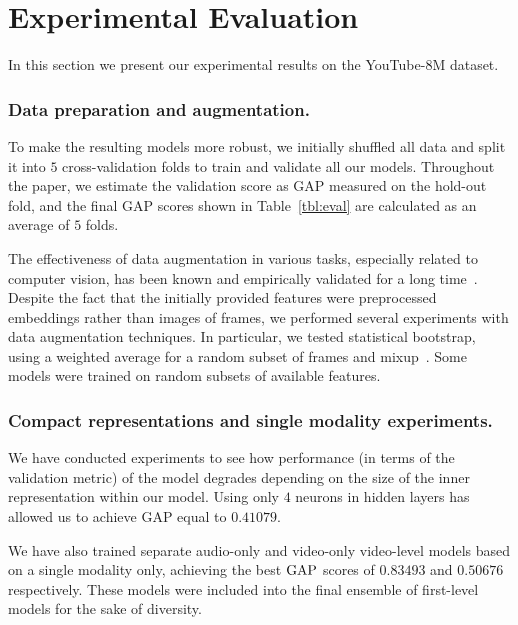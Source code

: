 \documentclass[runningheads]{llncs}
\begin{document}
\section{Experimental Evaluation}\label{sec:eval}

In this section we present our experimental results on the YouTube-8M dataset.

\subsubsection*{Data preparation and augmentation.}
To make the resulting models more robust, we initially shuffled all data and split it into $5$ cross-validation folds to train and validate all our models. Throughout the paper, we estimate the validation score as GAP measured on the hold-out fold, and the final GAP scores shown in Table~\ref{tbl:eval} are calculated as an average of $5$ folds.

The effectiveness of data augmentation in various tasks, especially related to computer vision, has been known and empirically validated for a long time~\cite{DBLP:journals/corr/abs-1003-0358,DBLP:journals/corr/abs-1712-04621,DBLP:journals/corr/abs-1708-06020}. Despite the fact that the initially provided features were preprocessed embeddings rather than images of frames, we performed several experiments with data augmentation techniques. In particular, we tested statistical bootstrap, using a weighted average for a random subset of frames and mixup~\cite{zhang2018mixup}. Some models were trained on random subsets of available features. 

\subsubsection*{Compact representations and single modality experiments.}
We have conducted experiments to see how performance (in terms of the validation metric) of the model degrades depending on the size of the inner representation within our model. Using only $4$ neurons in hidden layers has allowed us to achieve GAP equal to $0.41079$.

We have also trained separate audio-only and video-only video-level models based on a single modality only, achieving the best $\mathrm{GAP}$ scores of $0.83493$ and $0.50676$ respectively. These models were included into the final ensemble of first-level models for the sake of diversity.
\end{document}
